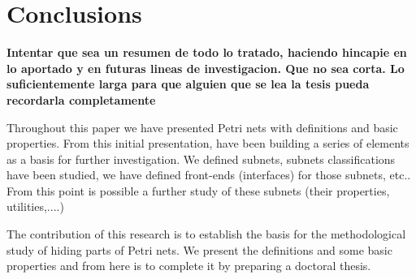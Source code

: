 
\chapter{Conclusions} %

\label{Chapter4} %


\textbf{Intentar que sea un resumen de todo lo tratado, haciendo hincapie en lo aportado
y en futuras lineas de investigacion. Que no sea corta. Lo suficientemente
larga para que alguien que se lea la tesis pueda recordarla completamente}

Throughout this paper we have presented Petri nets with definitions and basic properties. From this initial presentation, have been building a series of elements as a basis for further investigation. We defined subnets, subnets classifications have been studied, we have defined front-ends (interfaces) for those subnets, etc.. From this point is possible a further study of these subnets (their properties, utilities,....)

The contribution of this research is to establish the basis for the methodological study of hiding parts of Petri nets. We present the definitions and some basic properties and from here is to complete it by preparing a doctoral thesis.
